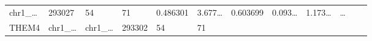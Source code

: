 \documentclass[
]{article}
\begin{document}
\begin{longtable}[]{@{}llllllllllll@{}}
\begin{minipage}[t]{0.06\columnwidth}
chr1\_\ldots{}\strut
\end{minipage} & \begin{minipage}[t]{0.06\columnwidth}\raggedright
293027\strut
\end{minipage} & \begin{minipage}[t]{0.06\columnwidth}\raggedright
54\strut
\end{minipage} & \begin{minipage}[t]{0.06\columnwidth}\raggedright
71\strut
\end{minipage} & \begin{minipage}[t]{0.06\columnwidth}\raggedright
0.486301\strut
\end{minipage} & \begin{minipage}[t]{0.08\columnwidth}\raggedright
3.677\ldots{}\strut
\end{minipage} & \begin{minipage}[t]{0.06\columnwidth}\raggedright
0.603699\strut
\end{minipage} & \begin{minipage}[t]{0.06\columnwidth}\raggedright
0.093\ldots{}\strut
\end{minipage} & \begin{minipage}[t]{0.09\columnwidth}\raggedright
1.173\ldots{}\strut
\end{minipage} & \begin{minipage}[t]{0.02\columnwidth}\raggedright
\ldots{}\strut
\end{minipage}\tabularnewline
\begin{minipage}[t]{0.06\columnwidth}\raggedright
THEM4\strut
\end{minipage} & \begin{minipage}[t]{0.06\columnwidth}\raggedright
chr1\_\ldots{}\strut
\end{minipage} & \begin{minipage}[t]{0.06\columnwidth}\raggedright
chr1\_\ldots{}\strut
\end{minipage} & \begin{minipage}[t]{0.06\columnwidth}\raggedright
293302\strut
\end{minipage} & \begin{minipage}[t]{0.06\columnwidth}\raggedright
54\strut
\end{minipage} & \begin{minipage}[t]{0.06\columnwidth}\raggedright
71\strut
\end{minipage} & \begin{minipage}[t]{0.06\columnwidth}\raggedright

\end{minipage}
\end{longtable}
\end{document}
